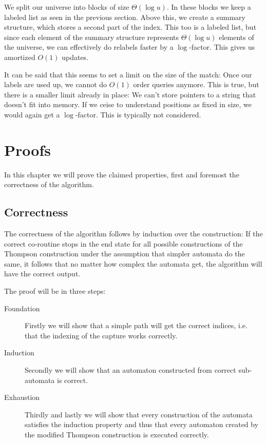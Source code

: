 \documentclass[11pt]{Thesis}
\theoremstyle{definition}
\begin{document}
We split our universe into blocks of size $\Theta(\log u)$. In these blocks we keep a 
labeled list as seen in the previous section. Above this, we create a summary 
structure, which stores a second part of the index. This too is a labeled 
list, but since each element of the summary structure represents 
$\Theta(\log u)$ elements of the universe, we can effectively do relabels 
faster by a $\log$-factor. This gives us amortized $O(1)$ updates.

It can be said that this seems to set a limit on the size of the match: Once 
our labels are used up, we cannot do $O(1)$ order queries anymore. This is 
true, but there is a smaller limit already in place: We can't store pointers 
to a string that doesn't fit into memory. If we ceise to understand positions 
as fixed in size, we would again get a $\log$-factor. This is typically not
considered.

\chapter{Proofs}
In this chapter we will prove the claimed properties, first and foremost the 
correctness of the algorithm.

\section{Correctness}
The correctness of the algorithm follows by induction over the construction:
If the correct co-routine stops in the end state for all possible
constructions of the Thompson construction under the assumption that simpler
automata do the same, it follows that no matter how complex the automata get,
the algorithm will have the correct output.

The proof will be in three steps:
\begin{description}
  \item[Foundation] Firstly we will show that a simple path
    will get the correct indices, i.e. that the indexing of the capture works correctly.
  \item[Induction] Secondly we will show that an automaton constructed from
    correct sub-automata is correct.
  \item[Exhaustion] Thirdly and lastly we will show that every construction
    of the automata satisfies the induction property and thus that every
    automaton created by the modified Thompson construction is executed correctly.
\end{description}
\end{document}
